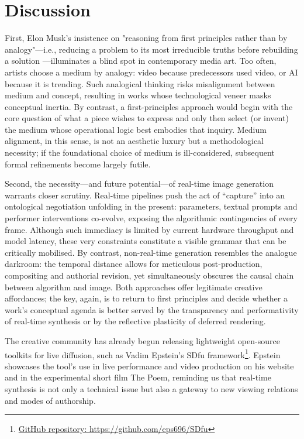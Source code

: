 \documentclass[sigconf,nonacm]{acmart}
\begin{document}

\section{Discussion}
First, Elon Musk's insistence on "reasoning from first principles rather than by analogy"—i.e., reducing a problem to its most irreducible truths before rebuilding a solution \cite{Brier2014}—illuminates a blind spot in contemporary media art. Too often, artists choose a medium by analogy: video because predecessors used video, or AI because it is trending. Such analogical thinking risks misalignment between medium and concept, resulting in works whose technological veneer masks conceptual inertia. By contrast, a first-principles approach would begin with the core question of what a piece wishes to express and only then select (or invent) the medium whose operational logic best embodies that inquiry. Medium alignment, in this sense, is not an aesthetic luxury but a methodological necessity; if the foundational choice of medium is ill-considered, subsequent formal refinements become largely futile.

Second, the necessity—and future potential—of real-time image generation warrants closer scrutiny. Real-time pipelines push the act of “capture” into an ontological negotiation unfolding in the present: parameters, textual prompts and performer interventions co-evolve, exposing the algorithmic contingencies of every frame. Although such immediacy is limited by current hardware throughput and model latency, these very constraints constitute a visible grammar that can be critically mobilised. By contrast, non-real-time generation resembles the analogue darkroom: the temporal distance allows for meticulous post-production, compositing and authorial revision, yet simultaneously obscures the causal chain between algorithm and image. Both approaches offer legitimate creative affordances; the key, again, is to return to first principles and decide whether a work’s conceptual agenda is better served by the transparency and performativity of real-time synthesis or by the reflective plasticity of deferred rendering.

The creative community has already begun releasing lightweight open-source toolkits for live diffusion, such as Vadim Epstein’s SDfu framework\footnote{\url{GitHub repository: https://github.com/eps696/SDfu}}. Epstein showcases the tool’s use in live performance and video production on his website\cite{epstein_wesual_2025} and in the experimental short film The Poem\cite{epstein_poem_2025}, reminding us that real-time synthesis is not only a technical issue but also a gateway to new viewing relations and modes of authorship.
\end{document}
